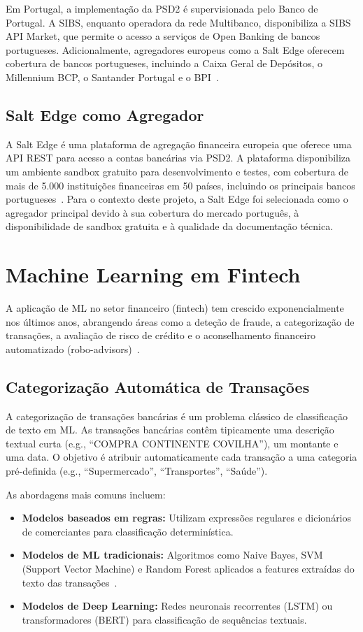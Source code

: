 Em Portugal, a implementação da \ac{PSD2} é supervisionada pelo Banco de Portugal. A \ac{SIBS}, enquanto operadora da rede Multibanco, disponibiliza a SIBS API Market, que permite o acesso a serviços de Open Banking de bancos portugueses. Adicionalmente, agregadores europeus como a Salt Edge oferecem cobertura de bancos portugueses, incluindo a Caixa Geral de Depósitos, o Millennium BCP, o Santander Portugal e o BPI~\cite{saltedge2024}.

\subsection{Salt Edge como Agregador}

A Salt Edge é uma plataforma de agregação financeira europeia que oferece uma \ac{API} \ac{REST} para acesso a contas bancárias via \ac{PSD2}. A plataforma disponibiliza um ambiente sandbox gratuito para desenvolvimento e testes, com cobertura de mais de 5.000 instituições financeiras em 50 países, incluindo os principais bancos portugueses~\cite{saltedge2024}. Para o contexto deste projeto, a Salt Edge foi selecionada como o agregador principal devido à sua cobertura do mercado português, à disponibilidade de sandbox gratuita e à qualidade da documentação técnica.


\section{Machine Learning em Fintech}
\label{sec:ea-ml}

A aplicação de \ac{ML} no setor financeiro (fintech) tem crescido exponencialmente nos últimos anos, abrangendo áreas como a deteção de fraude, a categorização de transações, a avaliação de risco de crédito e o aconselhamento financeiro automatizado (robo-advisors)~\cite{ml-fintech2024}.

\subsection{Categorização Automática de Transações}

A categorização de transações bancárias é um problema clássico de classificação de texto em \ac{ML}. As transações bancárias contêm tipicamente uma descrição textual curta (e.g., ``COMPRA CONTINENTE COVILHA''), um montante e uma data. O objetivo é atribuir automaticamente cada transação a uma categoria pré-definida (e.g., ``Supermercado'', ``Transportes'', ``Saúde'').

As abordagens mais comuns incluem:
\begin{itemize}
    \item \textbf{Modelos baseados em regras:} Utilizam expressões regulares e dicionários de comerciantes para classificação determinística.
    \item \textbf{Modelos de \ac{ML} tradicionais:} Algoritmos como Naive Bayes, SVM (Support Vector Machine) e Random Forest aplicados a features extraídas do texto das transações~\cite{sklearn2024}.
    \item \textbf{Modelos de Deep Learning:} Redes neuronais recorrentes (LSTM) ou transformadores (BERT) para classificação de sequências textuais.
\end{itemize}

